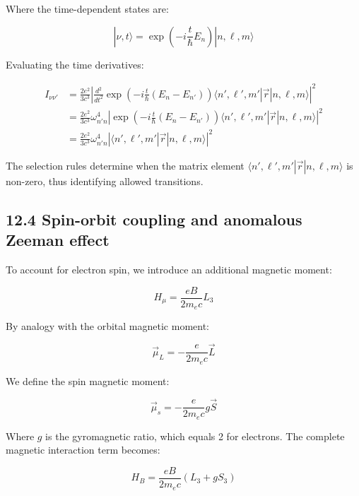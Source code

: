 \documentclass[10pt]{article}
\begin{document}
Where the time-dependent states are:

\begin{equation*}
|\nu,t\rangle=\exp\left(-i\frac{t}{\hbar}E_n\right)|n,\ell,m\rangle \tag{12.30}
\end{equation*}

Evaluating the time derivatives:

\begin{align*}
I_{\nu\nu'} &=\frac{2e^2}{3c^3}\left|\frac{d^2}{dt^2}\exp\left(-i\frac{t}{\hbar}(E_n-E_{n'})\right)\langle n',\ell',m'|\vec{r}|n,\ell,m\rangle\right|^2\\
&=\frac{2e^2}{3c^3}\omega_{n'n}^4\left|\exp\left(-i\frac{t}{\hbar}(E_n-E_{n'})\right)\langle n',\ell',m'|\vec{r}|n,\ell,m\rangle\right|^2 \tag{12.31}\\
&=\frac{2e^2}{3c^3}\omega_{n'n}^4\left|\langle n',\ell',m'|\vec{r}|n,\ell,m\rangle\right|^2
\end{align*}

The selection rules determine when the matrix element $\langle n',\ell',m'|\vec{r}|n,\ell,m\rangle$ is non-zero, thus identifying allowed transitions.

\subsection*{12.4 Spin-orbit coupling and anomalous Zeeman effect}
To account for electron spin, we introduce an additional magnetic moment:

\begin{equation*}
H_{\mu}=\frac{eB}{2m_e c}L_3 \tag{12.32}
\end{equation*}

By analogy with the orbital magnetic moment:

\begin{equation*}
\vec{\mu}_L=-\frac{e}{2m_e c}\vec{L} \tag{12.33}
\end{equation*}

We define the spin magnetic moment:

\begin{equation*}
\vec{\mu}_s=-\frac{e}{2m_e c}g\vec{S} \tag{12.34}
\end{equation*}

Where $g$ is the gyromagnetic ratio, which equals 2 for electrons. The complete magnetic interaction term becomes:

\begin{equation*}
H_B=\frac{eB}{2m_e c}(L_3+gS_3) \tag{12.35}
\end{equation*}
\end{document}
